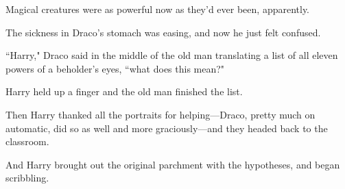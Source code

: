 Magical creatures were as powerful now as they'd ever been, apparently.

The sickness in Draco's stomach was easing, and now he just felt confused.

``Harry," Draco said in the middle of the old man translating a list of all eleven powers of a beholder's eyes, ``what does this mean?"

Harry held up a finger and the old man finished the list.

Then Harry thanked all the portraits for helping—Draco, pretty much on automatic, did so as well and more graciously—and they headed back to the classroom.

And Harry brought out the original parchment with the hypotheses, and began scribbling.

\pagebreak[2]

